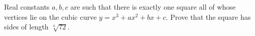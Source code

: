 Real constants $a, b, c$ are such that there is exactly one square all of whose vertices lie on the cubic curve $y = x^3 + ax^2 + bx + c$. Prove that the square has sides of length $\sqrt[4]{72}$.
